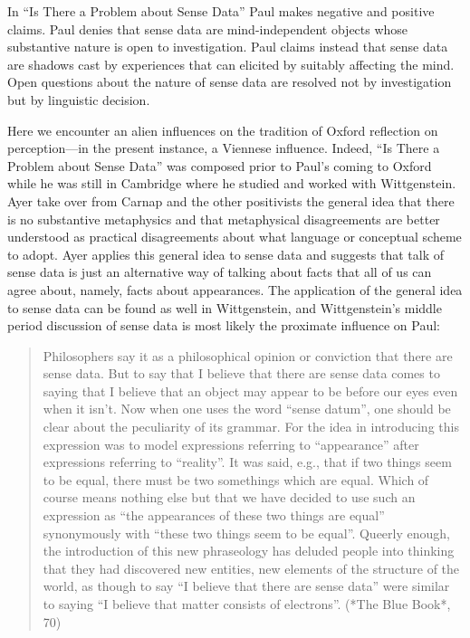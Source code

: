 \documentclass[11pt]{article}
\begin{document}
In ``Is There a Problem about Sense Data'' Paul makes negative and positive claims. Paul denies that sense data are mind-independent objects whose substantive nature is open to investigation. Paul claims instead that sense data are shadows cast by experiences that can elicited by suitably affecting the mind. Open questions about the nature of sense data are resolved not by investigation but by linguistic decision.

Here we encounter an alien influences on the tradition of Oxford reflection on perception---in the present instance, a Viennese influence. Indeed, ``Is There a Problem about Sense Data'' was composed prior to Paul's coming to Oxford while he was still in Cambridge where he studied and worked with Wittgenstein. 
Ayer take over from Carnap and the other positivists the general idea that there is no substantive metaphysics and that metaphysical disagreements are better understood as practical disagreements about what language or conceptual scheme to adopt. Ayer applies this general idea to sense data and suggests that talk of sense data is just an alternative way of talking about facts that all of us can agree about, namely, facts about appearances. The application of the general idea to sense data can be found as well in Wittgenstein, and Wittgenstein's middle period discussion of sense data is most likely the proximate influence on Paul:
\begin{quote}
	Philosophers say it as a philosophical opinion or conviction that there are sense data. But to say that I believe that there are sense data comes to saying that I believe that an object may appear to be before our eyes even when it isn't. Now when one uses the word ``sense datum'', one should be clear about the peculiarity of its grammar. For the idea in introducing this expression was to model expressions referring to ``appearance'' after expressions referring to ``reality''. It was said, e.g., that if two things seem to be equal, there must be two somethings which are equal. Which of course means nothing else but that we have decided to use such an expression as ``the appearances of these two things are equal'' synonymously with ``these two things seem to be equal''. Queerly enough, the introduction of this new phraseology has deluded people into thinking that they had discovered new entities, new elements of the structure of the world, as though to say ``I believe that there are sense data'' were similar to saying ``I believe that matter consists of electrons''. (*The Blue Book*, 70)
\end{quote}
\end{document}
